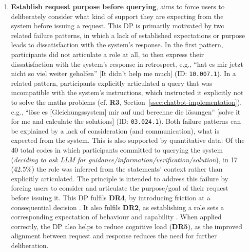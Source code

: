 \begin{enumerate}[label=\textbf{DP-\Alph*}, leftmargin=*]
    \item \textbf{Establish request purpose before querying}, aims to force users to deliberately consider what kind of support they are expecting from the system before issuing a request. This \ac{DP} is primarily motivated by two related failure patterns, in which a lack of established expectations or purpose leads to dissatisfaction with the system's response. In the first pattern, participants did not articulate a role at all, to then express their dissatisfaction with the system's response in retrospect, e.g., \enquote{hat es mir jetzt nicht so viel weiter geholfen} [It didn't help me much] (ID: \texttt{10.007.1}). In a related pattern, participants explicitly articulated a query that was incompatible with the system's instructions, which instructed it explicitly not to solve the maths problems (cf. \textbf{R3}, Section~\ref{ssec:chatbot-implementation}), e.g., \enquote{löse es [Gleichungssystem] mir auf und berechne die lösungen} [solve it for me and calculate the solutions] (ID: \texttt{03.024.1}). Both failure patterns can be explained by a lack of consideration (and communication), what is expected from the system. This is also supported by quantitative data: Of the 40 total codes in which participants committed to querying the system (\textit{deciding to ask LLM for guidance/information/verification/solution}), in 17 (42.5\%) the role was inferred from the statements' context rather than explicitly articulated. The principle is intended to address this failure by forcing users to consider and articulate the purpose/goal of their request before issuing it. This \ac{DP} fulfils \textbf{DR4}, by introducing friction at a consequential decision \parencite[cf.][]{Buinca2021, Weisz2025}. It also fulfils \textbf{DR2}, as establishing a role sets a corresponding expectation of behaviour and capability \parencite[cf.][]{Bansal2019}. When applied correctly, the \ac{DP} also helps to reduce cognitive load (\textbf{DR5}), as the improved alignment between request and response reduces the need for further deliberation.


\end{enumerate}

